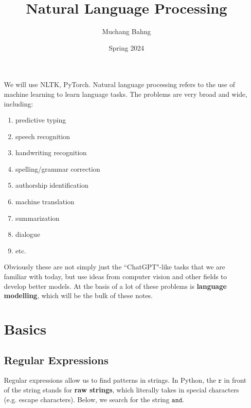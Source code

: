 \documentclass{article}
\begin{document}
\title{Natural Language Processing}
\author{Muchang Bahng}
\date{Spring 2024}

\maketitle
\tableofcontents
\pagebreak

We will use NLTK, PyTorch. Natural language processing refers to the use of machine learning to learn language tasks. The problems are very broad and wide, including: 
\begin{enumerate}
  \item predictive typing 
  \item speech recognition 
  \item handwriting recognition 
  \item spelling/grammar correction 
  \item authorship identification 
  \item machine translation 
  \item summarization 
  \item dialogue 
  \item etc. 
\end{enumerate}
Obviously these are not simply just the ``ChatGPT"-like tasks that we are familiar with today, but use ideas from computer vision and other fields to develop better models. At the basis of a lot of these problems is \textbf{language modelling}, which will be the bulk of these notes. 

\section{Basics}

  \subsection{Regular Expressions}

    Regular expressions allow us to find patterns in strings. In Python, the $\texttt{r}$ in front of the string stands for \textbf{raw strings}, which literally takes in special characters (e.g. escape characters). Below, we search for the string $\texttt{and}$. 
\end{document}
